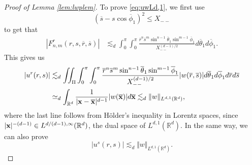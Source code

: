 \documentclass[11pt]{amsart}
\theoremstyle{definition}
\theoremstyle{remark}
\numberwithin{equation}{section}
\numberwithin{equation}{section}
\newcommand{\nrm}[1]{\Vert#1\Vert}
\newcommand{\br}[1]{\overline{#1}}
\newcommand{\0}{\emptyset}
\newcommand{\tht}{\theta}
\newcommand{\bfx}{{\bf x}}
\newcommand{\bbR}{\mathbb R}
\begin{document}
	\begin{proof}[Proof of Lemma \ref{lem:lwplem}]
		To prove \eqref{eq:uwLd,1}, we first use
		\begin{equation}
			(\br{s}-s\cos\br{\phi}_{1}%
			)^{2}\leq X_{--}
		\end{equation}
		to get that
		\begin{equation}
			\begin{aligned}
				|F_{n,m}^{r}(r,s,\br{r},\br{s})|&\lesssim_{d} \int_{0}^{\pi}\int_{0}^{\pi}\frac{\br{r}^{n}\br{s}^{m}\sin^{n-1}\br{\tht}_{1}\sin^{m-1}\br{\phi}_{1}}{X_{--}^{(d-1)/2}}d\br{\tht}_{1}d\br{\phi}_{1}.
			\end{aligned}
		\end{equation}
		This gives us
\begin{equation}
	\begin{aligned}
		|u^{r}(r,s)|&\lesssim_{d} \iint_{\Pi}\int_{0}^{\pi}\int_{0}^{\pi}\frac{\br{r}^{n}\br{s}^{m}\sin^{n-1}\br{\tht}_{1}\sin^{m-1}\br{\phi}_{1}}{X_{--}^{(d-1)/2}}|w(\br{r},\br{s})|d\br{\tht}_{1}d\br{\phi}_{1}d\br{r}d\br{s}\\
		&\simeq_{d} \int_{\bbR^{d}}\frac{1}{|\bfx-\br{\bfx}|^{d-1}}|w(\br{\bfx})|d\br{\bfx}\lesssim_{d} \nrm{w}_{L^{d,1}(\bbR^{d})},
	\end{aligned}
\end{equation}
where the last line follows from Hölder's inequality in Lorentz spaces, since $|\bfx|^{-(d-1)}\in L^{d/(d-1),\infty}(\bbR^{d})$, the dual space of $L^{d,1}(\bbR^{d})$. In the same way, we can also prove
\begin{equation}
|u^{s}(r,s)|\lesssim_{d}\nrm{w}_{L^{d,1}(\bbR^{d})}.
\end{equation}


\end{proof}
\end{document}
